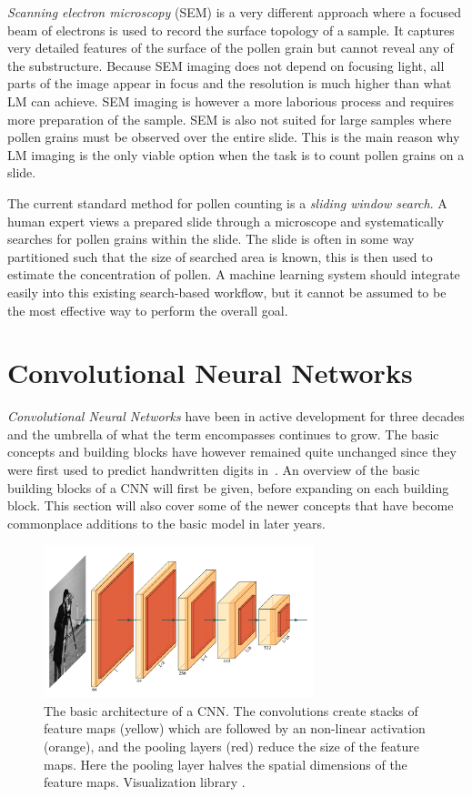 \textit{Scanning electron microscopy} (SEM) is a very different approach where a focused beam of electrons is used to record the surface topology of a sample.
It captures very detailed features of the surface of the pollen grain but cannot reveal any of the substructure.
Because SEM imaging does not depend on focusing light, all parts of the image appear in focus and the resolution is much higher than what LM can achieve.
SEM imaging is however a more laborious process and requires more preparation of the sample.
SEM is also not suited for large samples where pollen grains must be observed over the entire slide.
This is the main reason why LM imaging is the only viable option when the task is to count pollen grains on a slide.

The current standard method for pollen counting is a \textit{sliding window search}.
A human expert views a prepared slide through a microscope and systematically searches for pollen grains within the slide.
The slide is often in some way partitioned such that the size of searched area is known, this is then  used to estimate the concentration of pollen.
A machine learning system should integrate easily into this existing search-based workflow, but it cannot be assumed to be the most effective way to perform the overall goal.

\section{Convolutional Neural Networks}\label{sec:back-cnn}
\emph{Convolutional Neural Networks} have been in active development for three decades and the umbrella of what the term encompasses continues to grow.
The basic concepts and building blocks have however remained quite unchanged since they were first used to predict handwritten digits in\ \textcite{1989Hdrw}.
An overview of the basic building blocks of a CNN will first be given, before expanding on each building block.
This section will also cover some of the newer concepts that have become commonplace additions to the basic model in later years.

\begin{figure}[htbp]
  \centering
  \includegraphics[width=0.7\textwidth]{figs/background/cnn-layers.pdf}
  \caption[Basic structure of a CNN]{The basic architecture of a CNN\@. The convolutions create stacks of feature maps (yellow) which are followed by an non-linear activation (orange), and the pooling layers (red) reduce the size of the feature maps. Here the pooling layer halves the spatial dimensions of the feature maps. Visualization library \parencite{haris_2018}.}\label{fig:back-cnn-example}
\end{figure}

